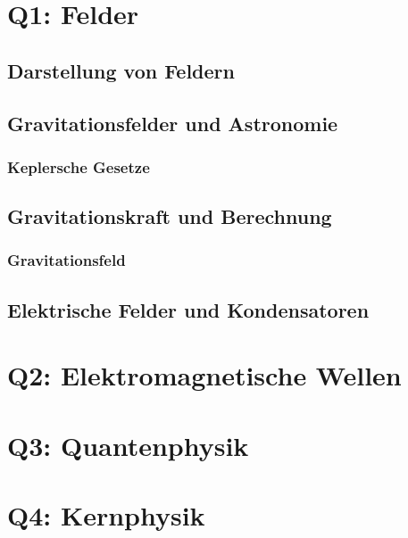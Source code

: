 \documentclass{article}
\begin{document}
    \section{Q1: Felder}

        \subsection{Darstellung von Feldern}

        \subsection{Gravitationsfelder und Astronomie}

            \subsubsection{Keplersche Gesetze}

            \subsection{Gravitationskraft und Berechnung}

            \subsubsection{Gravitationsfeld}

        \subsection{Elektrische Felder und Kondensatoren}

    \section{Q2: Elektromagnetische Wellen}

    \section{Q3: Quantenphysik}

    \section{Q4: Kernphysik}
\end{document}
